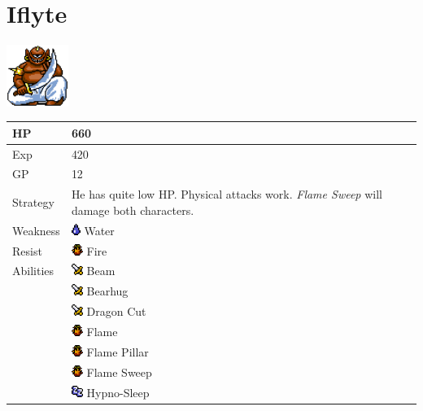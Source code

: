 \section{Iflyte}
\label{monster:iflyte}

\includegraphics[height=2cm,keepaspectratio]{./resources/monster/iflyte}

\begin{longtable}{ l p{9cm} }
	HP
	& 660
\\ \hline
	Exp
	& 420
\\ \hline
	GP
	& 12
\\ \hline
	Strategy
	& He has quite low HP. Physical attacks work. \textit{Flame Sweep} will damage both characters.
\\ \hline
	Weakness
	& \includegraphics[height=1em,keepaspectratio]{./resources/effects/water} Water
\\ \hline
	Resist
	& \includegraphics[height=1em,keepaspectratio]{./resources/effects/fire} Fire
\\ \hline
	Abilities
	& \includegraphics[height=1em,keepaspectratio]{./resources/effects/damage} Beam \\
	& \includegraphics[height=1em,keepaspectratio]{./resources/effects/damage} Bearhug \\
	& \includegraphics[height=1em,keepaspectratio]{./resources/effects/damage} Dragon Cut \\
	& \includegraphics[height=1em,keepaspectratio]{./resources/effects/fire} Flame \\
	& \includegraphics[height=1em,keepaspectratio]{./resources/effects/fire} Flame Pillar \\
	& \includegraphics[height=1em,keepaspectratio]{./resources/effects/fire} Flame Sweep \\
	& \includegraphics[height=1em,keepaspectratio]{./resources/effects/sleep} Hypno-Sleep
\end{longtable}
